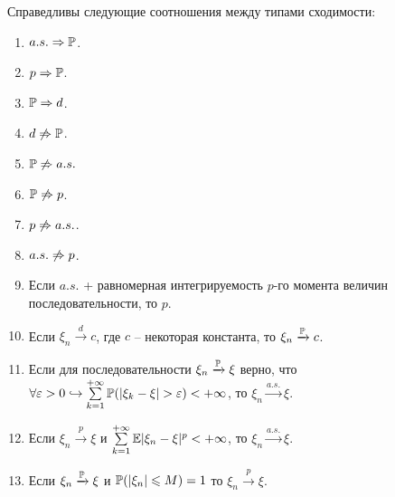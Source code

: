 \begin{theorem}
    Справедливы следующие соотношения между типами сходимости:
    \begin{enumerate}
        \item $a.s. \Ra \P$.
        \item $p \Ra \P$.
        \item $\P \Ra d$.
        \item $d \not\Ra \P$.
        \item $\P \not\Ra a.s.$
        \item $\P \not\Ra p$.
        \item $p \not\Ra a.s.$.
        \item $a.s. \not\Ra p$.
        \item Если $a.s.$ + равномерная интегрируемость $p$-го момента величин последовательности, то $p$.
        \item Если $\xi_n \xrightarrow{d} c$, где $c$ -- некоторая константа, то $\xi_n \xrightarrow{\P} c$.
        \item Если для последовательности $\xi_n \xrightarrow{\P} \xi$ верно, что $\forall \epsilon > 0 \hookrightarrow \sum\limits_{k = 1}^{+\infty} \P(|\xi_k - \xi| > \epsilon) < +\infty$, то $\xi_n \xrightarrow{a.s.} \xi$.
        \item Если $\xi_n \xrightarrow{p} \xi$ и $\sum\limits_{k = 1}^{+\infty} \Ex |\xi_n - \xi|^{p} < +\infty$, то $\xi_n \xrightarrow{a.s.} \xi$.
        \item Если $\xi_n \xrightarrow{\P} \xi$ и $\P(|\xi_n| \leq M) = 1$ то $\xi_n \xrightarrow{p} \xi$.
    \end{enumerate}
\end{theorem}
